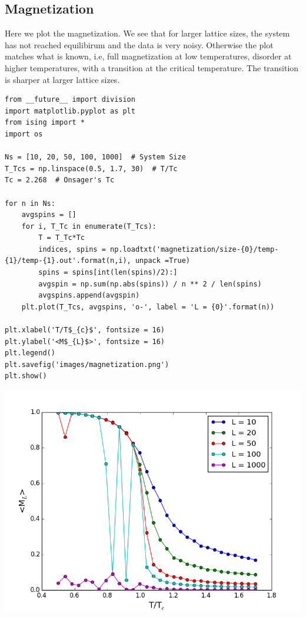\documentclass{article}
\begin{document}
\subsection{Magnetization}
\label{sec-5-2}
Here we plot the magnetization. We see that for larger lattice sizes, the system has not reached equilibirum and the data is very noisy. Otherwise the plot matches what is known, i.e, full magnetization at low temperatures, disorder at higher temperatures, with a transition at the critical temperature. The transition is sharper at larger lattice sizes. 

\begin{verbatim}
from __future__ import division
import matplotlib.pyplot as plt
from ising import *
import os

Ns = [10, 20, 50, 100, 1000]  # System Size
T_Tcs = np.linspace(0.5, 1.7, 30)  # T/Tc
Tc = 2.268  # Onsager's Tc

for n in Ns:
    avgspins = []
    for i, T_Tc in enumerate(T_Tcs):
        T = T_Tc*Tc
        indices, spins = np.loadtxt('magnetization/size-{0}/temp-{1}/temp-{1}.out'.format(n,i), unpack =True)
        spins = spins[int(len(spins)/2):]
        avgspin = np.sum(np.abs(spins)) / n ** 2 / len(spins)
        avgspins.append(avgspin)
    plt.plot(T_Tcs, avgspins, 'o-', label = 'L = {0}'.format(n))

plt.xlabel('T/T$_{c}$', fontsize = 16)
plt.ylabel('<M$_{L}$>', fontsize = 16)
plt.legend()
plt.savefig('images/magnetization.png')
plt.show()
\end{verbatim}

\includegraphics[width=.9\linewidth]{./images/magnetization.png}
\end{document}
